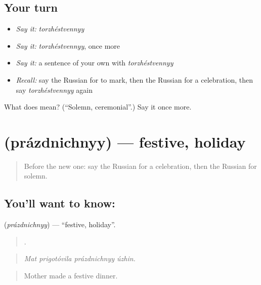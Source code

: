 \subsection*{Your turn}
\begin{itemize}
\raggedright
  \item \emph{Say it:} \emph{torzhéstvennyy}
  \item \emph{Say it:} \emph{torzhéstvennyy}, once more
  \item \emph{Say it:} a sentence of your own with \emph{torzhéstvennyy}
  \item \emph{Recall:} say the Russian for to mark, then the Russian for a celebration, then say \emph{torzhéstvennyy} again
\end{itemize}

\begin{tcolorbox}[breakable,colback=teal!4,colframe=teal!35!black,title={Before you move on}]
What does  mean? (\textquotedblleft{}Solemn, ceremonial\textquotedblright{}.) Say it once more.
\end{tcolorbox}
\section[\texorpdfstring{\ru{праздничный} (prázdnichnyy)}{праздничный (prázdnichnyy)}]{ (prázdnichnyy) — festive, holiday}

\label{lesson:RU-C311-prazdnichnyy}



\begin{quote}
Before the new one: say the Russian for a celebration, then the Russian for solemn.
\end{quote}

\subsection*{You'll want to know: }
\textbf{} (\emph{prázdnichnyy}) — \textquotedblleft{}festive, holiday\textquotedblright{}.

\begin{quote}
   .
\end{quote}

\begin{quote}
\emph{Mat prigotóvila prázdnichnyy úzhin.}
\end{quote}

\begin{quote}
Mother made a festive dinner.
\end{quote}


